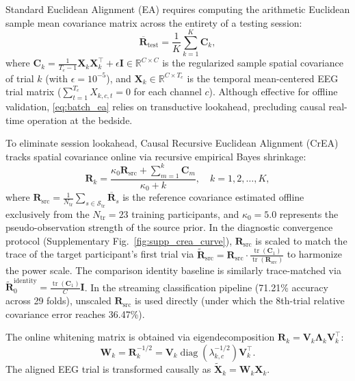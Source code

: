 \documentclass[journal]{IEEEtran}
\begin{document}
Standard Euclidean Alignment (EA) requires computing the arithmetic Euclidean sample mean covariance matrix across the entirety of a testing session:
\begin{equation}
\overline{\mathbf{R}}_{\mathrm{test}} = \frac{1}{K} \sum_{k=1}^K \mathbf{C}_k,
\label{eq:batch_ea}
\end{equation}
where $\mathbf{C}_k = \frac{1}{T_e - 1} \mathbf{X}_k \mathbf{X}_k^\top + \epsilon \mathbf{I} \in \mathbb{R}^{C \times C}$ is the regularized sample spatial covariance of trial $k$ (with $\epsilon = 10^{-5}$), and $\mathbf{X}_k \in \mathbb{R}^{C \times T_e}$ is the temporal mean-centered EEG trial matrix ($\sum_{t=1}^{T_e} X_{k,c,t} = 0$ for each channel $c$). Although effective for offline validation, \eqref{eq:batch_ea} relies on transductive lookahead, precluding causal real-time operation at the bedside.

To eliminate session lookahead, Causal Recursive Euclidean Alignment (CrEA) tracks spatial covariance online via recursive empirical Bayes shrinkage:
\begin{equation}
\mathbf{R}_k = \frac{\kappa_0 \mathbf{R}_{\mathrm{src}} + \sum_{m=1}^k \mathbf{C}_m}{\kappa_0 + k}, \quad k = 1, 2, \dots, K,
\label{eq:supp_crea}
\end{equation}
where $\mathbf{R}_{\mathrm{src}} = \frac{1}{N_{\mathrm{tr}}} \sum_{s \in \mathcal{S}_{\mathrm{tr}}} \overline{\mathbf{R}}_s$ is the reference covariance estimated offline exclusively from the $N_{\mathrm{tr}} = 23$ training participants, and $\kappa_0 = 5.0$ represents the pseudo-observation strength of the source prior. In the diagnostic convergence protocol (Supplementary Fig.~\ref{fig:supp_crea_curve}), $\mathbf{R}_{\mathrm{src}}$ is scaled to match the trace of the target participant's first trial via $\widetilde{\mathbf{R}}_{\mathrm{src}} = \mathbf{R}_{\mathrm{src}} \cdot \frac{\operatorname{tr}(\mathbf{C}_1)}{\operatorname{tr}(\mathbf{R}_{\mathrm{src}})}$ to harmonize the power scale. The comparison identity baseline is similarly trace-matched via $\widetilde{\mathbf{R}}_0^{\mathrm{identity}} = \frac{\operatorname{tr}(\mathbf{C}_1)}{C} \mathbf{I}$. In the streaming classification pipeline (71.21\% accuracy across 29 folds), unscaled $\mathbf{R}_{\mathrm{src}}$ is used directly (under which the 8th-trial relative covariance error reaches 36.47\%).

The online whitening matrix is obtained via eigendecomposition $\mathbf{R}_k = \mathbf{V}_k \boldsymbol{\Lambda}_k \mathbf{V}_k^\top$:
\begin{equation}
\mathbf{W}_k = \mathbf{R}_k^{-1/2} = \mathbf{V}_k \operatorname{diag}\left(\lambda_{k,c}^{-1/2}\right) \mathbf{V}_k^\top.
\label{eq:whitening}
\end{equation}
The aligned EEG trial is transformed causally as $\widetilde{\mathbf{X}}_k = \mathbf{W}_k \mathbf{X}_k$.
\end{document}
